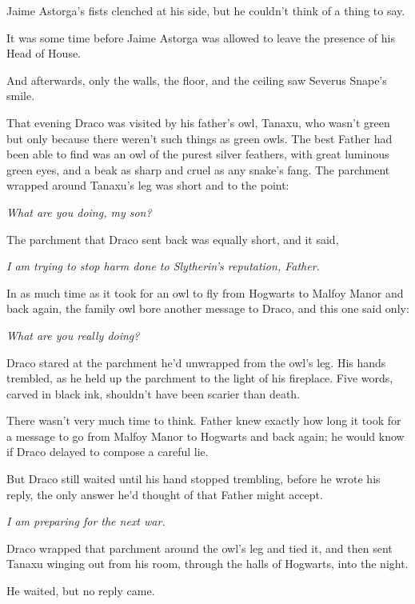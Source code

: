 Jaime Astorga’s fists clenched at his side, but he couldn’t think of a thing to say.

It was some time before Jaime Astorga was allowed to leave the presence of his Head of House.

And afterwards, only the walls, the floor, and the ceiling saw Severus Snape’s smile.

\later

That evening Draco was visited by his father’s owl, Tanaxu, who wasn’t green but only because there weren’t such things as green owls. The best Father had been able to find was an owl of the purest silver feathers, with great luminous green eyes, and a beak as sharp and cruel as any snake’s fang. The parchment wrapped around Tanaxu’s leg was short and to the point:

\emph{What are you doing, my son?}

The parchment that Draco sent back was equally short, and it said,

\emph{I am trying to stop harm done to Slytherin’s reputation, Father.}

In as much time as it took for an owl to fly from Hogwarts to Malfoy Manor and back again, the family owl bore another message to Draco, and this one said only:

\emph{What are you really doing?}

Draco stared at the parchment he’d unwrapped from the owl’s leg. His hands trembled, as he held up the parchment to the light of his fireplace. Five words, carved in black ink, shouldn’t have been scarier than death.

There wasn’t very much time to think. Father knew exactly how long it took for a message to go from Malfoy Manor to Hogwarts and back again; he would know if Draco delayed to compose a careful lie.

But Draco still waited until his hand stopped trembling, before he wrote his reply, the only answer he’d thought of that Father might accept.

\emph{I am preparing for the next war.}

Draco wrapped that parchment around the owl’s leg and tied it, and then sent Tanaxu winging out from his room, through the halls of Hogwarts, into the night.

He waited, but no reply came.

